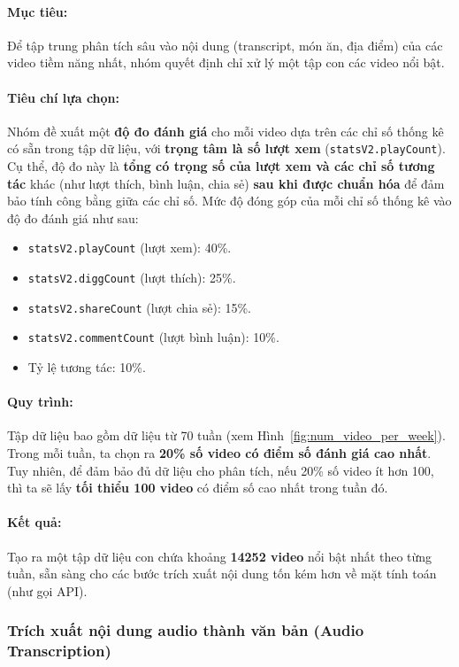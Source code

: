 \paragraph{Mục tiêu:} 
Để tập trung phân tích sâu vào nội dung (transcript, món ăn, địa điểm) của các video tiềm năng nhất, nhóm quyết định chỉ xử lý một tập con các video nổi bật.

\paragraph{Tiêu chí lựa chọn:}
Nhóm đề xuất một \textbf{độ đo đánh giá} cho mỗi video dựa trên các chỉ số thống kê có sẵn trong tập dữ liệu, với \textbf{trọng tâm là số lượt xem} (\texttt{statsV2.playCount}). Cụ thể, độ đo này là \textbf{tổng có trọng số của lượt xem và các chỉ số tương tác} khác (như lượt thích, bình luận, chia sẻ) \textbf{sau khi được chuẩn hóa} để đảm bảo tính công bằng giữa các chỉ số. Mức độ đóng góp của mỗi chỉ số thống kê vào độ đo đánh giá như sau:
\begin{itemize}
    \item \texttt{statsV2.playCount} (lượt xem): 40\%.
    \item \texttt{statsV2.diggCount} (lượt thích): 25\%.
    \item \texttt{statsV2.shareCount} (lượt chia sẻ): 15\%.
    \item \texttt{statsV2.commentCount} (lượt bình luận): 10\%.
    \item Tỷ lệ tương tác: 10\%.
\end{itemize}

\paragraph{Quy trình:}
Tập dữ liệu bao gồm dữ liệu từ 70 tuần (xem Hình~\ref{fig:num_video_per_week}). Trong mỗi tuần, ta chọn ra \textbf{20\% số video có điểm số đánh giá cao nhất}. Tuy nhiên, để đảm bảo đủ dữ liệu cho phân tích, nếu 20\% số video ít hơn 100, thì ta sẽ lấy \textbf{tối thiểu 100 video} có điểm số cao nhất trong tuần đó.

\paragraph{Kết quả:}
Tạo ra một tập dữ liệu con chứa khoảng \textbf{14252 video} nổi bật nhất theo từng tuần, sẵn sàng cho các bước trích xuất nội dung tốn kém hơn về mặt tính toán (như gọi API).

\subsubsection{Trích xuất nội dung audio thành văn bản (Audio Transcription)} \label{subsubsec:transcript}

